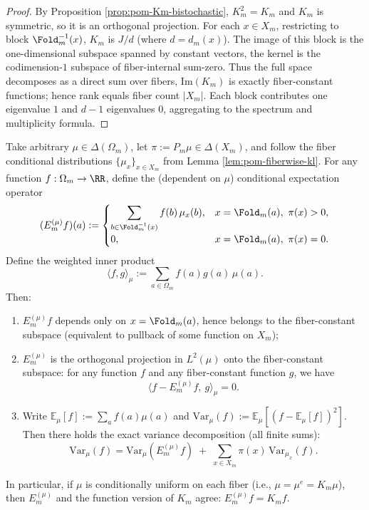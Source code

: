 \begin{proof}
By Proposition \ref{prop:pom-Km-bistochastic}, $K_m^2=K_m$ and $K_m$ is symmetric, so it is an orthogonal projection.
For each $x\in X_m$, restricting to block $\Fold_m^{-1}(x)$, $K_m$ is $J/d$ (where $d=d_m(x)$). The image of this block is the one-dimensional subspace spanned by constant vectors, the kernel is the codimension-$1$ subspace of fiber-internal sum-zero.
Thus the full space decomposes as a direct sum over fibers, $\mathrm{Im}(K_m)$ is exactly fiber-constant functions; hence rank equals fiber count $|X_m|$.
Each block contributes one eigenvalue $1$ and $d-1$ eigenvalues $0$, aggregating to the spectrum and multiplicity formula.
\end{proof}

\begin{proposition}\label{prop:pom-weighted-condexp-variance}
Take arbitrary $\mu\in\Delta(\Omega_m)$, let $\pi:=P_m\mu\in\Delta(X_m)$, and follow the fiber conditional distributions $\{\mu_x\}_{x\in X_m}$ from Lemma \ref{lem:pom-fiberwise-kl}.
For any function $f:\Omega_m\to\RR$, define the (dependent on $\mu$) conditional expectation operator
\[
(E_{m}^{(\mu)}f)(a):=
\begin{cases}
\displaystyle \sum_{b\in \Fold_m^{-1}(x)} f(b)\,\mu_x(b),& x=\Fold_m(a),\ \pi(x)>0,\\[6pt]
0,& x=\Fold_m(a),\ \pi(x)=0.
\end{cases}
\]
Define the weighted inner product
\[
\langle f,g\rangle_\mu:=\sum_{a\in\Omega_m} f(a)g(a)\,\mu(a).
\]
Then:
\begin{enumerate}
  \item $E_m^{(\mu)}f$ depends only on $x=\Fold_m(a)$, hence belongs to the fiber-constant subspace (equivalent to pullback of some function on $X_m$);
  \item $E_m^{(\mu)}$ is the orthogonal projection in $L^2(\mu)$ onto the fiber-constant subspace: for any function $f$ and any fiber-constant function $g$, we have
  \[
  \boxed{\;\langle f-E_m^{(\mu)}f,\ g\rangle_\mu=0.\;}
  \]
  \item Write
  \(
  \mathbb{E}_\mu[f]:=\sum_a f(a)\mu(a)
  \)
  and
  \(
  \mathrm{Var}_\mu(f):=\mathbb{E}_\mu[(f-\mathbb{E}_\mu[f])^2]
  \).
  Then there holds the exact variance decomposition (all finite sums):
  \[
  \boxed{\;
  \mathrm{Var}_\mu(f)=\mathrm{Var}_\mu(E_m^{(\mu)}f)\;+\;\sum_{x\in X_m}\pi(x)\,\mathrm{Var}_{\mu_x}(f).
  \;}
  \]
\end{enumerate}
In particular, if $\mu$ is conditionally uniform on each fiber (i.e., $\mu=\mu^e=K_m\mu$), then $E_m^{(\mu)}$ and the function version of $K_m$ agree: $E_m^{(\mu)}f=K_m f$.
\end{proposition}
